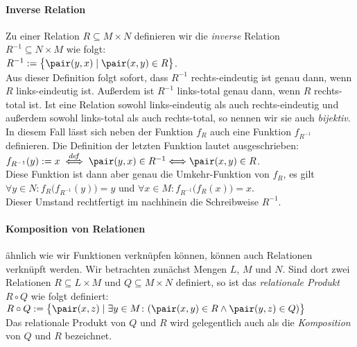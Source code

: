 \paragraph{Inverse Relation}
Zu einer  Relation $R \subseteq M \times N$ definieren wir die \emph{inverse} Relation \\
$R^{-1} \subseteq N \times M$ wie folgt: \\[0.2cm]
\hspace*{1.3cm} $R^{-1} := \bigl\{ \pair(y,x) \mid \pair(x,y) \in R  \bigr\}$. \\[0.2cm]
Aus dieser Definition folgt sofort, dass $R^{-1}$ rechts-eindeutig ist genau dann, wenn
$R$ links-eindeutig ist.  Außerdem ist $R^{-1}$ links-total genau dann, wenn $R$
rechts-total ist.  Ist eine Relation sowohl links-eindeutig als auch rechts-eindeutig und
außerdem sowohl links-total als auch rechts-total, so nennen wir sie auch \emph{bijektiv}.
In diesem Fall l\"{a}sst sich neben der Funktion
$f_R$ auch eine Funktion $f_{R^{-1}}$ definieren.  Die Definition der letzten Funktion
lautet ausgeschrieben: \\[0.2cm]
\hspace*{1.3cm} $f_{R^{-1}}(y) := x \;\stackrel{de\!f}{\Longleftrightarrow}\; \pair(y,x) \in R^{-1} \Longleftrightarrow \pair(x,y) \in R$. \\[0.2cm]
Diese Funktion ist dann aber genau die Umkehr-Funktion von $f_R$, es gilt \\[0.2cm]
\hspace*{1.3cm}
 $\forall y \in N \colon f_R\bigl(f_{R^{-1}}(y)\bigr) = y$ \quad und \quad
 $\forall x \in M \colon f_{R^{-1}}\bigl(f_R(x)\bigr) = x$. \\[0.2cm]
Dieser Umstand rechtfertigt im nachhinein die Schreibweise $R^{-1}$.

\paragraph{Komposition von Relationen}
\"{a}hnlich wie wir Funktionen verkn\"{u}pfen k\"{o}nnen, k\"{o}nnen auch Relationen verkn\"{u}pft werden.
Wir betrachten zun\"{a}chst Mengen $L$, $M$ und $N$.
Sind dort zwei Relationen $R \subseteq L \times M$ und $Q \subseteq M \times N$ definiert,
so ist das \emph{relationale Produkt} $R \circ Q$ wie folgt definiert: \\[0.2cm]
\hspace*{1.3cm}
$R \circ Q := \bigl\{ \pair(x,z) \mid \exists y \in M \colon(\pair(x,y) \in R \wedge \pair(y,z) \in Q) \bigr\}$ 
\\[0.2cm]
Das relationale Produkt von $Q$ und $R$ wird gelegentlich auch als die \emph{Komposition} von
$Q$ und $R$ bezeichnet.  

